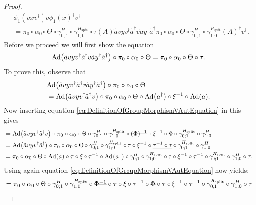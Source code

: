 \documentclass[12pt,a4paper,twoside]{article}
\numberwithin{equation}{section}
\begin{document}
\begin{proof}
\begin{align}
	&\phi_1(vxv^\dagger)v\phi_1(x)^\dagger v^\dagger\\
	\label{eq:lem:phi1phi2matchingCondition:Proof_v_Part1}
	&=\pi_0\circ\alpha_0\circ\Theta\circ\gamma^{H}_{0;1}\circ\gamma^{H_{\text{split}}}_{1;0}\circ\tau(A)\tilde{a}vyv^\dagger\tilde{a}^\dagger v \tilde{a}y^\dagger\tilde{a}^\dagger \pi_0\circ\alpha_0\circ\Theta\circ\gamma^{H}_{0;1}\circ\gamma^{H_{\text{split}}}_{1;0}(A)^\dagger v^\dagger.
	\end{align}
	Before we proceed we will first show the equation
	\begin{equation}\label{eq:lem:phi1phi2matchingCondition:Proof_v_Part2}
		\Ad{\tilde{a}vyv^\dagger\tilde{a}^\dagger v\tilde{a}y^\dagger\tilde{a}^\dagger}\circ\pi_0\circ\alpha_0\circ\Theta=\pi_0\circ\alpha_0\circ\Theta\circ\tau.
	\end{equation}
	To prove this, observe that
	\begin{align}
	&\Ad{\tilde{a}vyv^\dagger\tilde{a}^\dagger v\tilde{a}y^\dagger\tilde{a}^\dagger}\circ\pi_0\circ\alpha_0\circ\Theta\\
	&=\Ad{\tilde{a}vyv^\dagger\tilde{a}^\dagger v}\circ\pi_0\circ\alpha_0\circ\Theta\circ\Ad{a^\dagger}\circ\xi^{-1}\circ\Ad{a}.
	\end{align}
	Now inserting equation \eqref{eq:DefinitionOfGroupMorphismVAutEquation} in this gives
	\begin{align}
	&=\Ad{\tilde{a}vyv^\dagger\tilde{a}^\dagger v}\circ\pi_0\circ\alpha_0\circ\Theta\circ\gamma^{H}_{0;1}\circ\gamma^{H_{\text{split}}}_{1;0}\circ\stkout{(\Phi)^{-1}}\circ\xi^{-1}\circ\stkout{\Phi}\circ\gamma^{H_{\text{split}}}_{0;1}\circ\gamma^H_{1;0}\\
	&=\Ad{\tilde{a}vyv^\dagger\tilde{a}^\dagger }\circ\pi_0\circ\alpha_0\circ\Theta\circ\gamma^{H}_{0;1}\circ\gamma^{H_{\text{split}}}_{1;0}\circ\tau\circ\xi^{-1}\circ\underline{\tau^{-1}\circ\tau}\circ\gamma^{H_{\text{split}}}_{0;1}\circ\gamma^H_{1;0}\\
	&=\pi_0\circ\alpha_0\circ\Theta\circ\Ad{a}\circ\tau\circ\xi\circ\tau^{-1}\circ\Ad{a^\dagger}\circ\gamma^{H}_{0;1}\circ\gamma^{H_{\text{split}}}_{1;0}\circ\tau\circ\xi^{-1}\circ\tau^{-1}\circ\gamma^{H_{\text{split}}}_{0;1}\circ\gamma^H_{1;0}\circ\tau.
	\end{align}
	Using again equation \eqref{eq:DefinitionOfGroupMorphismVAutEquation} now yields:
	\begin{align}
	&=\pi_0\circ\alpha_0\circ\Theta\circ\gamma^{H}_{0;1}\circ\gamma^{H_{\text{split}}}_{1;0}\circ\stkout{\Phi^{-1}}\circ\tau\circ\xi\circ\tau^{-1}\circ\stkout{\Phi}\circ\tau\circ\xi^{-1}\circ\tau^{-1}\circ\gamma^{H_{\text{split}}}_{0;1}\circ\gamma^H_{1;0}\circ\tau\\

\end{align}
\end{proof}
\end{document}
